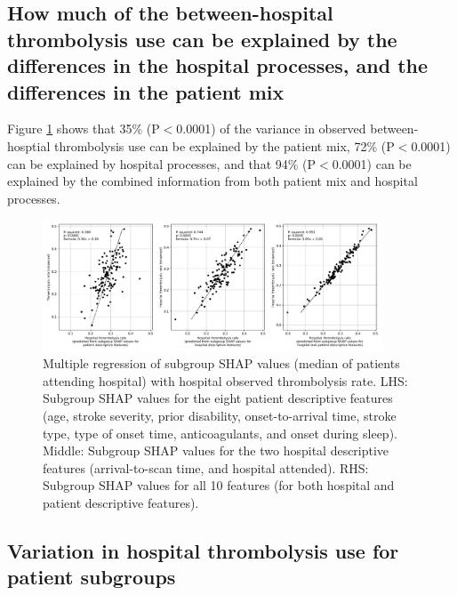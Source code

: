 \subsection{How much of the between-hospital thrombolysis use can be explained by the differences in the hospital processes, and the differences in the patient mix}%

Figure \ref{fig:shap_multiple_regression} shows that 35\% (P$<$0.0001) of the variance in observed between-hosptial thrombolysis use can be explained by the patient mix, 72\% (P$<$0.0001) can be explained by hospital processes, and that 94\% (P$<$0.0001) can be explained by the combined information from both patient mix and hospital processes. 


\begin{figure}[!h]
    \centering
    \includegraphics[width=0.9\textwidth]{./images/03e_xgb_10_features_multiple_regression_patient_hosptial}
    \caption{Multiple regression of subgroup SHAP values (median of patients attending hospital) with hospital observed thrombolysis rate. LHS: Subgroup SHAP values for the eight patient descriptive features (age, stroke severity, prior disability, onset-to-arrival time, stroke type, type of onset time, anticoagulants, and onset during sleep). Middle: Subgroup SHAP values for the two hospital descriptive features (arrival-to-scan time, and hospital attended). RHS: Subgroup SHAP values for all 10 features (for both hospital and patient descriptive features).}
  \label{fig:shap_multiple_regression}
\end{figure}

\subsection{Variation in hospital thrombolysis use for patient subgroups}


